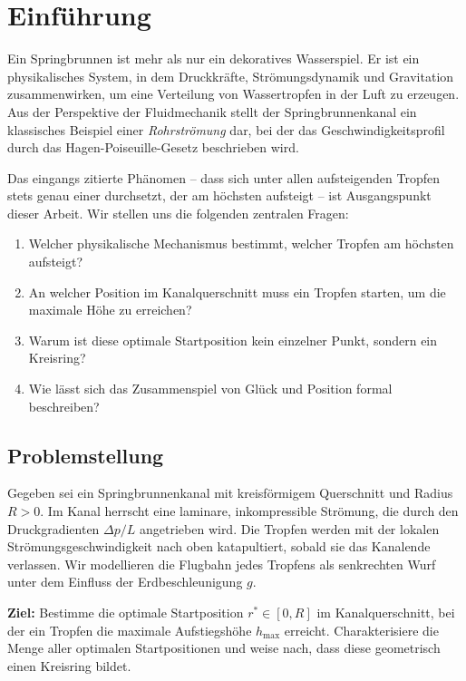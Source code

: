 ﻿\documentclass[a4paper,12pt]{article}
\theoremstyle{definition}
\begin{document}
\tableofcontents
\newpage

\section{Einführung}

Ein Springbrunnen ist mehr als nur ein dekoratives Wasserspiel. Er ist ein physikalisches
System, in dem Druckkräfte, Strömungsdynamik und Gravitation zusammenwirken, um eine
Verteilung von Wassertropfen in der Luft zu erzeugen. Aus der Perspektive der Fluidmechanik
stellt der Springbrunnenkanal ein klassisches Beispiel einer
\emph{Rohrströmung} dar, bei der das Geschwindigkeitsprofil durch das
Hagen-Poiseuille-Gesetz beschrieben wird.

Das eingangs zitierte Phänomen -- dass sich unter allen aufsteigenden Tropfen stets genau einer
durchsetzt, der am höchsten aufsteigt -- ist Ausgangspunkt dieser Arbeit. Wir stellen uns die
folgenden zentralen Fragen:

\begin{enumerate}
    \item Welcher physikalische Mechanismus bestimmt, welcher Tropfen am höchsten aufsteigt?
    \item An welcher Position im Kanalquerschnitt muss ein Tropfen starten, um die
          maximale Höhe zu erreichen?
    \item Warum ist diese optimale Startposition kein einzelner Punkt, sondern ein Kreisring?
    \item Wie lässt sich das Zusammenspiel von Glück und Position formal beschreiben?
\end{enumerate}

\subsection{Problemstellung}

Gegeben sei ein Springbrunnenkanal mit kreisförmigem Querschnitt und Radius $R > 0$.
Im Kanal herrscht eine laminare, inkompressible Strömung, die durch den Druckgradienten
$\Delta p / L$ angetrieben wird. Die Tropfen werden mit der lokalen Strömungsgeschwindigkeit
nach oben katapultiert, sobald sie das Kanalende verlassen. Wir modellieren die Flugbahn
jedes Tropfens als senkrechten Wurf unter dem Einfluss der Erdbeschleunigung $g$.

\textbf{Ziel:} Bestimme die optimale Startposition $r^* \in [0, R]$ im Kanalquerschnitt,
bei der ein Tropfen die maximale Aufstiegshöhe $h_{\max}$ erreicht. Charakterisiere die
Menge aller optimalen Startpositionen und weise nach, dass diese geometrisch einen
Kreisring bildet.
\end{document}
